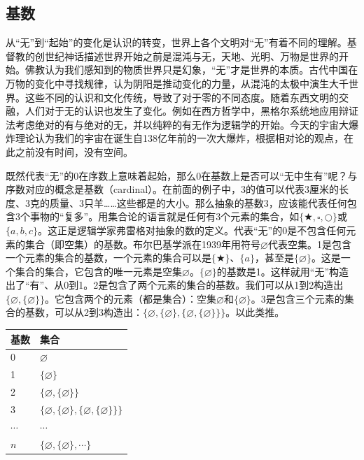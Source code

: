 \documentclass[b5paper]{ctexart}
\begin{document}
\subsection{基数}

从“无”到“起始”的变化是认识的转变，世界上各个文明对“无”有着不同的理解。基督教的创世纪神话描述世界开始之前是混沌与无，天地、光明、万物是世界的开始。佛教认为我们感知到的物质世界只是幻象，“无”才是世界的本质。古代中国在万物的变化中寻找规律，认为阴阳是推动变化的力量，从混沌的太极中演生大千世界。这些不同的认识和文化传统，导致了对于零的不同态度。随着东西文明的交融，人们对于无的认识也发生了变化。例如在西方哲学中，黑格尔系统地应用辩证法考虑绝对的有与绝对的无，并以纯粹的有无作为逻辑学的开始。今天的宇宙大爆炸理论认为我们的宇宙在诞生自138亿年前的一次大爆炸，根据相对论的观点，在此之前没有时间，没有空间。

 
既然代表“无”的0在序数上意味着起始，那么0在基数上是否可以“无中生有”呢？与序数对应的概念是基数（cardinal）。在前面的例子中，3的值可以代表3厘米的长度、3克的质量、3只羊……这些都是的大小。那么抽象的基数3，应该能代表任何包含3个事物的“复多”。用集合论的语言就是任何有3个元素的集合，如$\{\bigstar, \square, \bigcirc \}$或$\{a, b, c\}$。这正是逻辑学家弗雷格对抽象的数的定义。代表“无”的0是不包含任何元素的集合（即空集）的基数。布尔巴基学派在1939年用符号$\varnothing$代表空集。1是包含一个元素的集合的基数，一个元素的集合可以是$\{ \bigstar \}$、$\{ a \}$，甚至是$\{ \varnothing \}$。这是一个集合的集合，它包含的唯一元素是空集$\varnothing$。$\{ \varnothing \}$的基数是1。这样就用“无”构造出了“有”、从0到1。2是包含了两个元素的集合的基数。我们可以从1到2构造出$\{ \varnothing, \{ \varnothing \} \}$。它包含两个的元素（都是集合）：空集$\varnothing$和$\{ \varnothing \}$。3是包含三个元素的集合的基数，可以从2到3构造出：$\{ \varnothing, \{ \varnothing \}, \{ \varnothing, \{ \varnothing \} \}\}$。以此类推。

\begin{tabular}{l|l}
  基数 & 集合 \\
  \hline
  0 & $\varnothing$ \\
  1 & $\{ \varnothing \}$ \\
  2 & $\{ \varnothing, \{ \varnothing \} \}$ \\
  3 & $\{ \varnothing, \{ \varnothing \}, \{ \varnothing, \{ \varnothing \} \}\}$ \\
  $\cdots$ & $\cdots$ \\
  $n$ & $\{ \varnothing, \{ \varnothing \}, \cdots \}$
\end{tabular}
\end{document}
